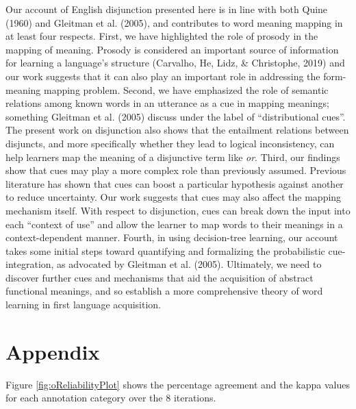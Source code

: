 \documentclass[
  ,man,floatsintext]{apa6}
\begin{document}
Our account of English disjunction presented here is in line with both Quine (1960) and Gleitman et al. (2005), and contributes to word meaning mapping in at least four respects. First, we have highlighted the role of prosody in the mapping of meaning. Prosody is considered an important source of information for learning a language's structure (Carvalho, He, Lidz, \& Christophe, 2019) and our work suggests that it can also play an important role in addressing the form-meaning mapping problem. Second, we have emphasized the role of semantic relations among known words in an utterance as a cue in mapping meanings; something Gleitman et al. (2005) discuss under the label of ``distributional cues''. The present work on disjunction also shows that the entailment relations between disjuncts, and more specifically whether they lead to logical inconsistency, can help learners map the meaning of a disjunctive term like \emph{or}. Third, our findings show that cues may play a more complex role than previously assumed. Previous literature has shown that cues can boost a particular hypothesis against another to reduce uncertainty. Our work suggests that cues may also affect the mapping mechanism itself. With respect to disjunction, cues can break down the input into each ``context of use'' and allow the learner to map words to their meanings in a context-dependent manner. Fourth, in using decision-tree learning, our account takes some initial steps toward quantifying and formalizing the probabilistic cue-integration, as advocated by Gleitman et al. (2005). Ultimately, we need to discover further cues and mechanisms that aid the acquisition of abstract functional meanings, and so establish a more comprehensive theory of word learning in first language acquisition.

\hypertarget{appendix}{%
\section{Appendix}\label{appendix}}

Figure \ref{fig:oReliabilityPlot} shows the percentage agreement and the kappa values for each annotation category over the 8 iterations.
\end{document}
